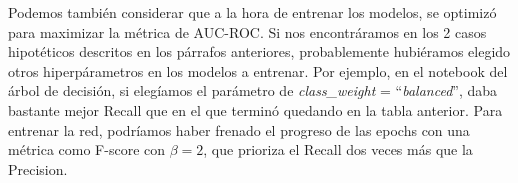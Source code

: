 \documentclass[12pt]{article}
\numberwithin{equation}{section}
\numberwithin{figure}{section}
\numberwithin{table}{section}
\begin{document}
	Podemos también considerar que a la hora de entrenar los modelos, se optimizó para 
	maximizar la métrica de AUC-ROC. Si nos encontráramos en los 2 casos hipotéticos
	descritos en los párrafos anteriores, probablemente hubiéramos elegido otros
	hiperpárametros en los modelos a entrenar. Por ejemplo, en el notebook del 
	árbol de decisión, si elegíamos el parámetro de \textit{class\_weight} = 
	``\textit{balanced}'', daba bastante mejor Recall que en el que terminó quedando en la
	tabla anterior. Para entrenar la red, podríamos haber frenado el progreso de las epochs
	con una métrica como F-score con $\beta = 2$, que prioriza el Recall dos veces más que
	la Precision.

	
\end{document}
